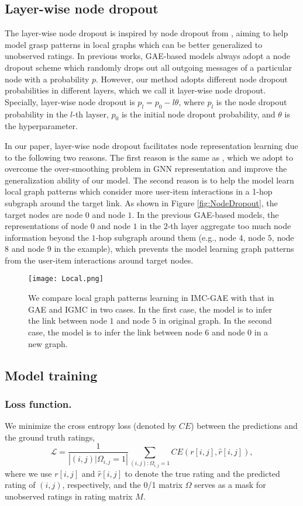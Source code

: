 \documentclass[sigconf]{acmart}
\begin{document}
\subsection{Layer-wise node dropout}
\label{sub_sec_3}
The layer-wise node dropout is inspired by node dropout from \cite{berg2017graph}, aiming to help model grasp patterns in local graphs which can be better generalized to unobserved ratings.
In previous works, GAE-based models always adopt a node dropout scheme which randomly drops out all outgoing messages of a particular node with a probability $p$. However, our method adopts different node dropout probabilities in different layers, which we call it layer-wise node dropout. Specially, layer-wise node dropout is $p_l = p_0 - l \theta$,
where $p_l$ is the node dropout probability in the $l$-th layser, $p_0$ is the initial node dropout probability, and $\theta$ is the hyperparameter. 

In our paper, layer-wise node dropout facilitates node representation learning due to the following two reasons. 
The first reason is the same as \cite{berg2017graph}, which we adopt to overcome the over-smoothing problem in GNN representation and improve the generalization ability of our model. 
The second reason is to help the model learn local graph patterns which consider more user-item interactions in a 1-hop subgraph around the target link. As shown in Figure \ref{fig:NodeDropout}, the target nodes are node $0$ and node $1$. In the previous GAE-based models, the representations of node $0$ and node $1$ in the $2$-th layer aggregate too much node information beyond the $1$-hop subgraph around them (e.g., node $4$, node $5$, node $8$ and node $9$ in the example), which prevents the model learning graph patterns from the user-item interactions around target nodes. 
\begin{figure*}[tp]
    \centering\texttt{[image: Local.png]}
    \caption{We compare local graph patterns learning in IMC-GAE with that in GAE and IGMC in two cases. In the first case, the model is to infer the link between node $1$ and node $5$ in original graph. In the second case, the model is to infer the link between node $6$ and node $0$ in a new graph.}
    \label{fig:Discuss}
\end{figure*}
\subsection{Model training}
\subsubsection{Loss function.} We minimize the cross entropy loss (denoted by $CE$) between the predictions and the ground truth ratings,
\begin{equation}
    \mathcal{L} = \frac{1}{|{(i, j)|\Omega_{i, j} = 1}|}\sum_{(i, j):\Omega_{i, j} = 1} CE(r[i, j], \hat{r}[i, j]),
\end{equation}
where we use $r[i, j]$ and $\hat{r}[i, j]$ to denote the true rating and the predicted rating of $(i, j)$, respectively, and the 0/1 matrix $\Omega$ serves as a mask for unobserved ratings in rating matrix $M$. 
\end{document}
